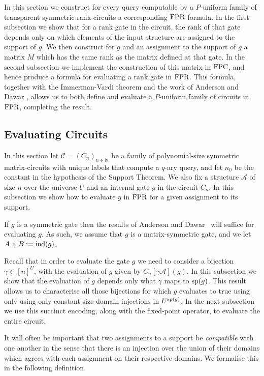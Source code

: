 \documentclass[../paper.tex]{subfiles}
\begin{document}
In this section we construct for every query computable by a $P$-uniform family
of transparent symmetric rank-circuits a corresponding $\text{\upshape FPR}$ formula. In the
first subsection we show that for a rank gate in the circuit, the rank of that
gate depends only on which elements of the input structure are assigned to the
support of $g$. We then construct for $g$ and an assignment to the support of
$g$ a matrix $M$ which has the same rank as the matrix defined at that gate. In
the second subsection we implement the construction of this matrix in $\text{\upshape FPC}$,
and hence produce a formula for evaluating a rank gate in $\text{\upshape FPR}$. This formula,
together with the Immerman-Vardi theorem and the work of Anderson and Dawar
\cite{AndersonD17}, allows us to both define and evaluate a $P$-uniform family
of circuits in $\text{\upshape FPR}$, completing the result.

\subsection {Evaluating Circuits}
In this section let $\mathcal{C} = (C_n)_{n \in \mathbb{N}}$ be a family of
polynomial-size symmetric matrix-circuits with unique labels that compute a
$q$-ary query, and let $n_0$ be the constant in the hypothesis of the Support
Theorem. We also fix a structure $\mathcal{A}$ of size $n$ over the universe $U$
and an internal gate $g$ in the circuit $C_n$. In this subsection we show how to
evaluate $g$ in $\text{\upshape FPR}$ for a given assignment to its support.

If $g$ is a symmetric gate then the results of Anderson and
Dawar~\cite{AndersonD17} will suffice for evaluating $g$. As such, we assume
that $g$ is a matrix-symmetric gate, and we let $A \times B := \text{\upshape ind}(g)$.

Recall that in order to evaluate the gate $g$ we need to consider a bijection
$\gamma \in [n]^{\underline{U}}$, with the evaluation of $g$ given by
$C_n[\gamma \mathcal{A}](g)$. In this subsection we show that the evaluation of
$g$ depends only what $\gamma$ maps to $\text{sp}(g)$. This result allows us to
characterise all those bijections for which $g$ evaluates to true using only
using only constant-size-domain injections in $U^{\text{sp}(g)}$. In the next
subsection we use this succinct encoding, along with the fixed-point operator,
to evaluate the entire circuit.
 
It will often be important that two assignments to a support be
\emph{compatible} with one another in the sense that there is an injection over
the union of their domains which agrees with each assignment on their respective
domains. We formalise this in the following definition.
\end{document}
